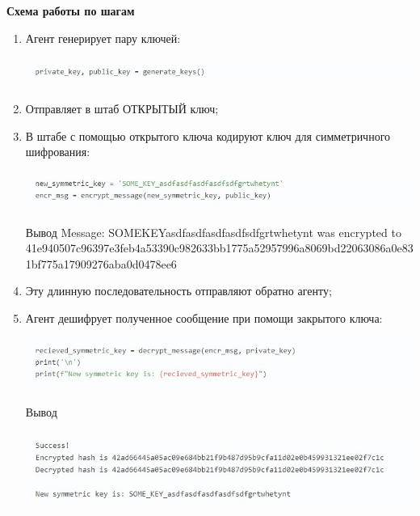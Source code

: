 \documentclass[12pt]{article}
\begin{document}
	\textbf{Схема работы по шагам}
	\begin{enumerate}
		\item Агент генерирует пару ключей:
				\begin{center}
				\includegraphics[width=1\linewidth]{pictures/code9.jpg}
				\end{center}
		\item Отправляет в штаб ОТКРЫТЫЙ ключ;
		
		\item В штабе с помощью открытого ключа кодируют ключ для симметричного шифрования:
				\begin{center}
					\includegraphics[width=1\linewidth]{pictures/code10.jpg}
				\end{center}
			Вывод	
			\vspace{1cm}
			Message: SOMEKEYasdfasdfasdfasdfsdfgrtwhetynt was encrypted to
			41e940507c96397e3feb4a53390c982633bb1775a52957996a8069bd22063086a0e831bf775a17909276aba0d0478ee6
			
			\item Эту длинную последовательность отправляют обратно агенту;
			\item Агент дешифрует полученное сообщение при помощи закрытого ключа:
				\begin{center}
					\includegraphics[width=1\linewidth]{pictures/code11.jpg}
				\end{center}
			
			Вывод
			
				\begin{center}
					\includegraphics[width=1\linewidth]{pictures/code12.jpg}
				\end{center}
			

\end{enumerate}
\end{document}
